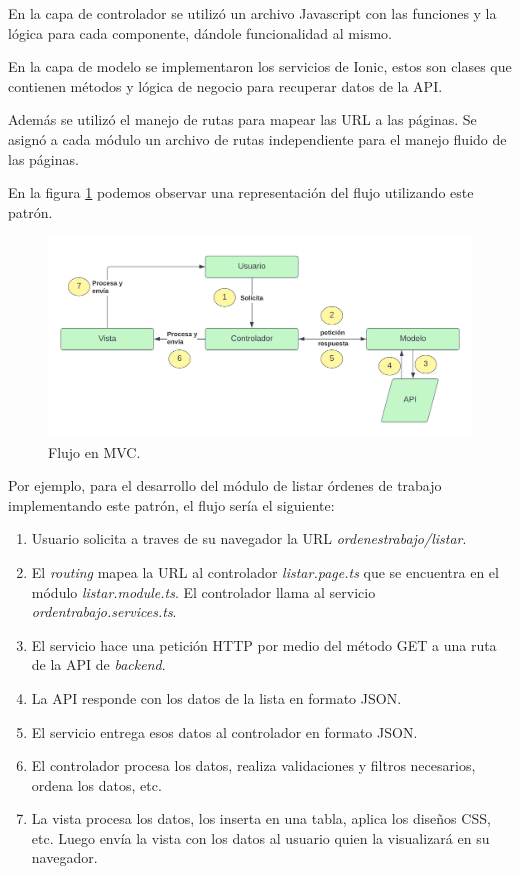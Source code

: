 En la capa de controlador se utilizó un archivo Javascript con las funciones y la lógica para cada componente, dándole funcionalidad al mismo. 

En la capa de modelo se implementaron los servicios de Ionic, estos son clases que contienen métodos y lógica de negocio para recuperar datos de la API. 

Además se utilizó el manejo de rutas para mapear las URL a las páginas. Se asignó a cada módulo un archivo de rutas independiente para el manejo fluido de las páginas.

En la figura \ref{fig:frontmvc} podemos observar una representación del flujo utilizando este patrón. 

\begin{figure}[H]
	\centering
	\includegraphics[scale=.15]{./Figures/front-mvc.png}
	\caption{Flujo en MVC.}
	\label{fig:frontmvc}
\end{figure}

Por ejemplo, para el desarrollo del módulo de listar órdenes de trabajo implementando este patrón, el flujo sería el siguiente:

\begin{enumerate}
\item Usuario solicita a traves de su navegador la URL \textit{ordenestrabajo/listar}.
\item El \textit{routing} mapea la URL al controlador \textit{listar.page.ts} que se encuentra en el módulo \textit{listar.module.ts}. El controlador llama al servicio \textit{ordentrabajo.services.ts}.
\item El servicio hace una petición HTTP por medio del método GET a una ruta de la API de \textit{backend}. 
\item La API responde con los datos de la lista en formato JSON.
\item El servicio entrega esos datos al controlador en formato JSON.
\item El controlador procesa los datos, realiza validaciones y filtros necesarios, ordena los datos, etc.
\item La vista procesa los datos, los inserta en una tabla, aplica los diseños CSS, etc. Luego envía la vista con los datos al usuario quien la visualizará en su navegador. 
\end{enumerate}

